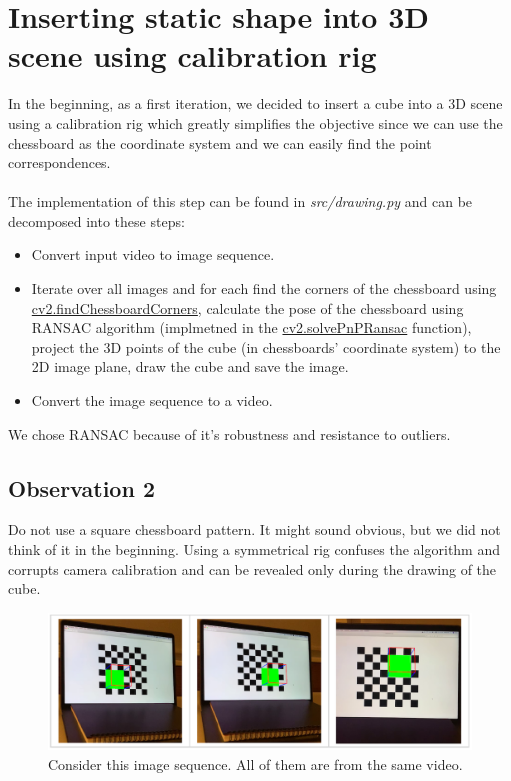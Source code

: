 \documentclass[paper=a4, fontsize=11pt]{scrartcl}
\numberwithin{equation}{section}		%
\numberwithin{figure}{section}			%
\numberwithin{table}{section}				%
\begin{document}
\section*{Inserting static shape into 3D scene using calibration rig}
In the beginning, as a first iteration, we decided to insert a cube into a 3D scene using a calibration rig which greatly simplifies the objective since we can use the chessboard as the coordinate system and we can easily find the point correspondences.\\\\The implementation of this step can be found in \emph{src/drawing.py} and can be decomposed into these steps:
\begin{itemize}
\item Convert input video to image sequence.
\item Iterate over all images and for each find the corners of the chessboard using \href{https://docs.opencv.org/2.4/modules/calib3d/doc/camera_calibration_and_3d_reconstruction.html#findchessboardcorners}{cv2.findChessboardCorners}, calculate the pose of the chessboard using RANSAC algorithm (implmetned in the \href{https://docs.opencv.org/2.4/modules/calib3d/doc/camera_calibration_and_3d_reconstruction.html?highlight=solvepnpransac#solvepnpransac}{cv2.solvePnPRansac} function), project the 3D points of the cube (in chessboards' coordinate system) to the 2D image plane, draw the cube and save the image.
\item Convert the image sequence to a video.
\end{itemize}
We chose RANSAC because of it's robustness and resistance to outliers.

\subsection*{Observation 2}
Do not use a square chessboard pattern. It might sound obvious, but we did not think of it in the beginning. Using a symmetrical rig confuses the algorithm and corrupts camera calibration and can be revealed only during the drawing of the cube.

\begin{figure}[h!]
\centering
\includegraphics[width=1\textwidth]{img/staticShape}
\caption{Consider this image sequence. All of them are from the same video.}
\end{figure}
\end{document}
